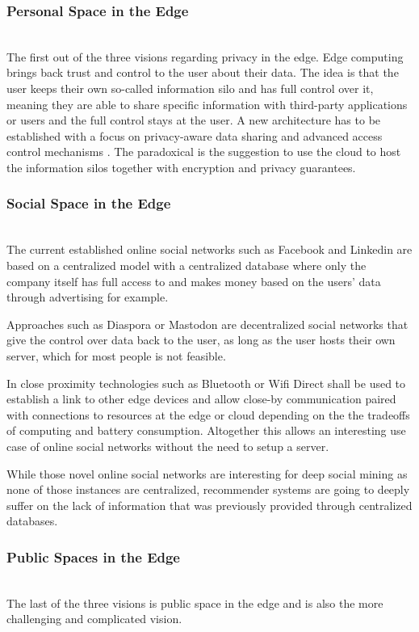 \subsubsection{Personal Space in the Edge}\hspace*{\fill} \\
The first out of the three visions regarding privacy in the edge.
Edge computing brings back trust and control to the user about their data. The idea is that the user keeps their own so-called information silo and has full control over it, meaning they are able to share specific information with third-party applications or users and the full control stays at the user.
A new architecture has to be established with a focus on privacy-aware data sharing and advanced access control mechanisms \cite{GarciaLopez:2015:ECV:2831347.2831354}.
The paradoxical is the suggestion to use the cloud to host the information silos together with encryption and privacy guarantees.

\subsubsection{Social Space in the Edge}\hspace*{\fill} \\
The current established online social networks such as Facebook and Linkedin are based on a centralized model with a centralized database where only the company itself has full access to and makes money based on the users’ data through advertising for example.

Approaches such as Diaspora or Mastodon are decentralized social networks that give the control over data back to the user, as long as the user hosts their own server, which for most people is not feasible.

In close proximity technologies such as Bluetooth or Wifi Direct shall be used to establish a link to other edge devices and allow close-by communication paired with connections to resources at the edge or cloud depending on the the tradeoffs of computing and battery consumption. Altogether this allows an interesting use case of online social networks without the need to setup a server.

While those novel online social networks are interesting for deep social mining as none of those instances are centralized, recommender systems are going to deeply suffer on the lack of information that was previously provided through centralized databases.

\subsubsection{Public Spaces in the Edge}\hspace*{\fill} \\
The last of the three visions is public space in the edge and is also the more challenging and complicated vision.

